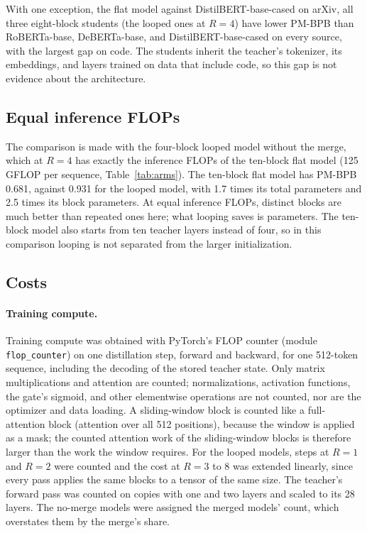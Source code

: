 \documentclass[11pt]{article}
\begin{document}
With one exception, the flat model against DistilBERT-base-cased on arXiv, all three eight-block students (the looped ones at $R = 4$) have
lower PM-BPB than RoBERTa-base, DeBERTa-base, and DistilBERT-base-cased on every source, with the largest gap on code. The students inherit the teacher's tokenizer, its embeddings, and layers trained
on data that include code, so this gap is not evidence about the architecture.

\subsection{Equal inference FLOPs}
\label{sec:isoflop}

The comparison is made with the four-block looped model without the merge, which at $R = 4$ has exactly the inference FLOPs of the ten-block
flat model (125 GFLOP per sequence, Table~\ref{tab:arms}). The ten-block flat model has PM-BPB 0.681, against 0.931 for the looped model,
with 1.7 times its total parameters and 2.5 times its block parameters. At equal inference FLOPs, distinct
blocks are much better than repeated ones here; what looping saves is parameters. The ten-block model also starts from ten teacher layers instead
of four, so in this comparison looping is not separated from the larger initialization.

\subsection{Costs}
\label{sec:costs}

\paragraph{Training compute.}
Training compute was obtained with PyTorch's FLOP counter (module \texttt{flop\_counter}) on one distillation step, forward and backward,
for one 512-token sequence, including the decoding of the stored teacher state. Only matrix multiplications and attention are counted;
normalizations, activation functions, the gate's sigmoid, and other elementwise operations are not counted, nor are the optimizer and data loading. A
sliding-window block is counted like a full-attention block (attention over all 512 positions), because the window is applied as a mask; the
counted attention work of the sliding-window blocks is therefore larger than the work the window requires. For the looped models, steps at $R = 1$
and $R = 2$ were counted and the cost at $R = 3$ to 8 was extended linearly, since every pass applies the same blocks to a tensor of the same
size. The teacher's forward pass was counted on copies with one and two layers and scaled to its 28 layers. The no-merge models were assigned the
merged models' count, which overstates them by the merge's share.
\end{document}

